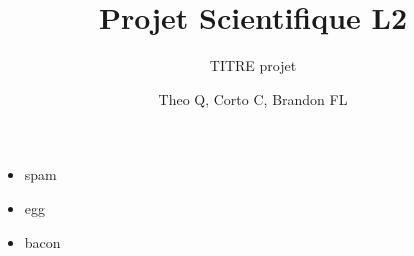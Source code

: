 \documentclass[10pt]{beamer}
\author{Theo Q, Corto C, Brandon FL}
\title{Projet Scientifique L2}
\subtitle{TITRE projet}
\institute{Nice}
\begin{document}
\begin{frame}
\titlepage
\end{frame}


\begin{frame}{1}

\begin{itemize}[<+->]
\item spam
\item egg
\item bacon

\end{itemize}


\end{frame}
\end{document}
